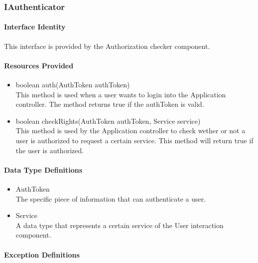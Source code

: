 \subsubsection{IAuthenticator}
\paragraph{Interface Identity}
This interface is provided by the Authorization checker component. 
\paragraph{Resources Provided}
\begin{itemize}
	\item{boolean auth(AuthToken authToken)}\\
	This method is used when a user wants to login into the Application controller. The
		method returns true if the authToken is valid.
	\item{boolean checkRights(AuthToken authToken, Service service)}\\
	This method is used by the Application controller to check wether or not a user is
		authorized to request a certain service. This method will return true if the user
		is authorized.
\end{itemize}
\paragraph{Data Type Definitions}
\begin{itemize}
	\item AuthToken\\
	The specific piece of information that can authenticate a user.
	\item Service\\
	A data type that represents a certain service of the User interaction component.
\end{itemize}
\paragraph{Exception Definitions}
